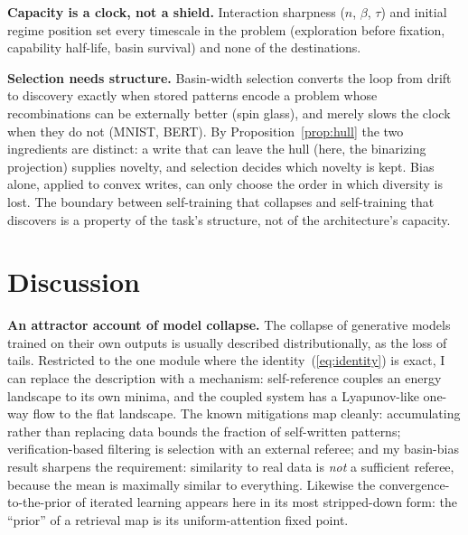 \documentclass[preprint,12pt,authoryear]{elsarticle}
\begin{document}
\textbf{Capacity is a clock, not a shield.} Interaction sharpness ($n$,
$\beta$, $\tau$) and initial regime position set every timescale in the
problem (exploration before fixation, capability half-life, basin
survival) and none of the destinations.

\textbf{Selection needs structure.} Basin-width selection converts the loop
from drift to discovery exactly when stored patterns encode a problem whose
recombinations can be externally better (spin glass), and merely slows the
clock when they do not (MNIST, BERT). By Proposition~\ref{prop:hull} the
two ingredients are distinct: a write that can leave the hull (here, the
binarizing projection) supplies novelty, and selection decides which
novelty is kept. Bias alone, applied to convex writes, can only choose
the order in which diversity is lost. The boundary between self-training
that collapses and self-training that discovers is a property of the task's
structure, not of the architecture's capacity.

\section{Discussion}

\textbf{An attractor account of model collapse.} The collapse of generative
models trained on their own outputs \citep{shumailov2024, alemohammad2024}
is usually described distributionally, as the loss of tails. Restricted to
the one module where the identity~(\ref{eq:identity}) is exact, I can
replace the description with a mechanism: self-reference couples an energy
landscape to its own minima, and the coupled system has a Lyapunov-like
one-way flow to the flat landscape. The known mitigations map cleanly:
accumulating rather than replacing data \citep{gerstgrasser2024} bounds the
fraction of self-written patterns; verification-based filtering is
selection with an external referee; and my basin-bias result sharpens the
requirement: similarity to real data is \emph{not} a sufficient referee,
because the mean is maximally similar to everything. Likewise the
convergence-to-the-prior of iterated learning \citep{griffiths2007} appears
here in its most stripped-down form: the ``prior'' of a retrieval map is
its uniform-attention fixed point.
\end{document}
